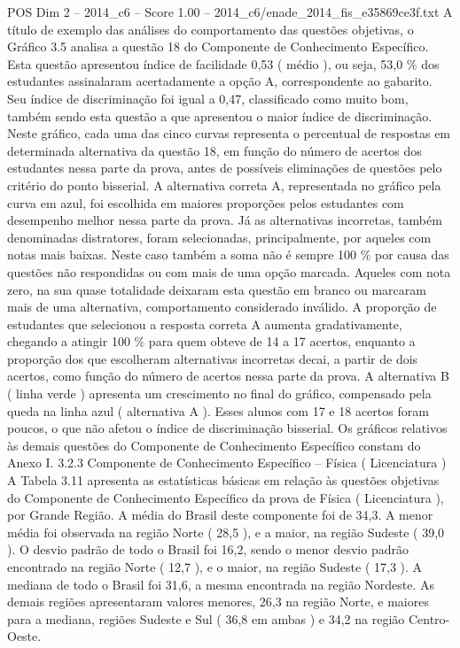 \begin{textsample}{POS Dim 2 – 2014\_c6 – Score 1.00 – 2014\_c6/enade\_2014\_fis\_e35869ce3f.txt}
A título de exemplo das análises do comportamento das questões objetivas, o Gráfico 3.5 analisa a questão 18 do Componente de Conhecimento Específico.
Esta questão apresentou índice de facilidade 0,53 ( médio ), ou seja, 53,0 \% dos estudantes assinalaram acertadamente a opção A, correspondente ao gabarito.
Seu índice de discriminação foi igual a 0,47, classificado como muito bom, também sendo esta questão a que apresentou o maior índice de discriminação.
Neste gráfico, cada uma das cinco curvas representa o percentual de respostas em determinada alternativa da questão 18, em função do número de acertos dos estudantes nessa parte da prova, antes de possíveis eliminações de questões pelo critério do ponto bisserial.
A alternativa correta A, representada no gráfico pela curva em azul, foi escolhida em maiores proporções pelos estudantes com desempenho melhor nessa parte da prova.
Já as alternativas incorretas, também denominadas distratores, foram selecionadas, principalmente, por aqueles com notas mais baixas.
Neste caso também a soma não é sempre 100 \% por causa das questões não respondidas ou com mais de uma opção marcada.
Aqueles com nota zero, na sua quase totalidade deixaram esta questão em branco ou marcaram mais de uma alternativa, comportamento considerado inválido.
A proporção de estudantes que selecionou a resposta correta A aumenta gradativamente, chegando a atingir 100 \% para quem obteve de 14 a 17 acertos, enquanto a proporção dos que escolheram alternativas incorretas decai, a partir de dois acertos, como função do número de acertos nessa parte da prova.
A alternativa B ( linha verde ) apresenta um crescimento no final do gráfico, compensado pela queda na linha azul ( alternativa A ).
Esses alunos com 17 e 18 acertos foram poucos, o que não afetou o índice de discriminação bisserial.
Os gráficos relativos às demais questões do Componente de Conhecimento Específico constam do Anexo I. 3.2.3 Componente de Conhecimento Específico – Física ( Licenciatura ) A Tabela 3.11 apresenta as estatísticas básicas em relação às questões objetivas do Componente de Conhecimento Específico da prova de Física ( Licenciatura ), por Grande Região.
A média do Brasil deste componente foi de 34,3.
A menor média foi observada na região Norte ( 28,5 ), e a maior, na região Sudeste ( 39,0 ).
O desvio padrão de todo o Brasil foi 16,2, sendo o menor desvio padrão encontrado na região Norte ( 12,7 ), e o maior, na região Sudeste ( 17,3 ).
A mediana de todo o Brasil foi 31,6, a mesma encontrada na região Nordeste.
As demais regiões apresentaram valores menores, 26,3 na região Norte, e maiores para a mediana, regiões Sudeste e Sul ( 36,8 em ambas ) e 34,2 na região Centro-Oeste.

\end{textsample}
